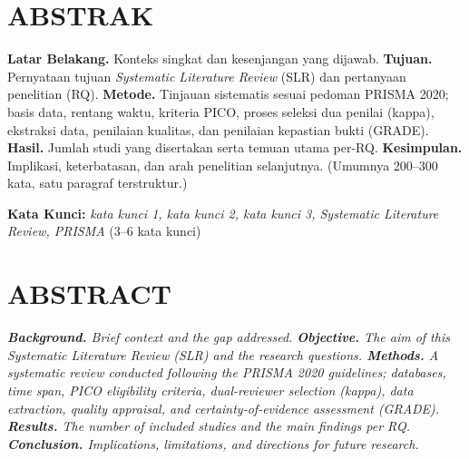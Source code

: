 \documentclass[12pt,a4paper,oneside]{report}
\begin{document}

\pagestyle{fancy}

\chapter*{ABSTRAK}
\justifying
\textbf{Latar Belakang.} Konteks singkat dan kesenjangan yang dijawab.
\textbf{Tujuan.} Pernyataan tujuan \textit{Systematic Literature Review} (SLR)
dan pertanyaan penelitian (RQ). \textbf{Metode.} Tinjauan sistematis sesuai
pedoman PRISMA 2020; basis data, rentang waktu, kriteria PICO, proses seleksi
dua penilai (kappa), ekstraksi data, penilaian kualitas, dan penilaian kepastian
bukti (GRADE). \textbf{Hasil.} Jumlah studi yang disertakan serta temuan utama
per-RQ. \textbf{Kesimpulan.} Implikasi, keterbatasan, dan arah penelitian
selanjutnya. (Umumnya 200--300 kata, satu paragraf terstruktur.)

\par\vspace{1em}
\noindent\textbf{Kata Kunci:} \textit{kata kunci 1, kata kunci 2, kata kunci 3,
Systematic Literature Review, PRISMA} (3--6 kata kunci)

\chapter*{ABSTRACT}
\justifying
\textit{\textbf{Background.} Brief context and the gap addressed.
\textbf{Objective.} The aim of this Systematic Literature Review (SLR) and the
research questions. \textbf{Methods.} A systematic review conducted following
the PRISMA 2020 guidelines; databases, time span, PICO eligibility criteria,
dual-reviewer selection (kappa), data extraction, quality appraisal, and
certainty-of-evidence assessment (GRADE). \textbf{Results.} The number of
included studies and the main findings per RQ. \textbf{Conclusion.}
Implications, limitations, and directions for future research.}
\end{document}

